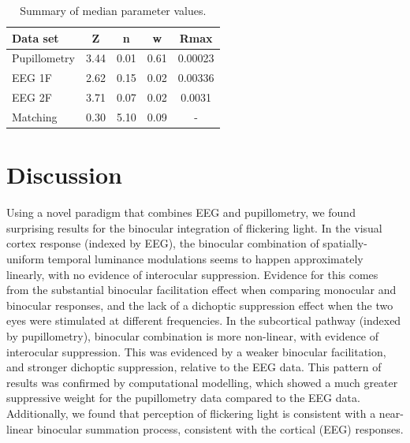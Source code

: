 \documentclass[
]{article}
\begin{document}
\begin{table}

\caption{\label{tab:paramtable}Summary of median parameter values.}
\centering
\begin{tabular}[t]{l|c|c|c|c}
\hline
Data set & Z & n & w & Rmax\\
\hline
Pupillometry & 3.44 & 0.01 & 0.61 & 0.00023\\
\hline
EEG 1F & 2.62 & 0.15 & 0.02 & 0.00336\\
\hline
EEG 2F & 3.71 & 0.07 & 0.02 & 0.0031\\
\hline
Matching & 0.30 & 5.10 & 0.09 & -\\
\hline
\end{tabular}
\end{table}

\hypertarget{discussion}{%
\section{Discussion}\label{discussion}}

Using a novel paradigm that combines EEG and pupillometry, we found surprising results for the binocular integration of flickering light. In the visual cortex response (indexed by EEG), the binocular combination of spatially-uniform temporal luminance modulations seems to happen approximately linearly, with no evidence of interocular suppression. Evidence for this comes from the substantial binocular facilitation effect when comparing monocular and binocular responses, and the lack of a dichoptic suppression effect when the two eyes were stimulated at different frequencies. In the subcortical pathway (indexed by pupillometry), binocular combination is more non-linear, with evidence of interocular suppression. This was evidenced by a weaker binocular facilitation, and stronger dichoptic suppression, relative to the EEG data. This pattern of results was confirmed by computational modelling, which showed a much greater suppressive weight for the pupillometry data compared to the EEG data. Additionally, we found that perception of flickering light is consistent with a near-linear binocular summation process, consistent with the cortical (EEG) responses.
\end{document}
